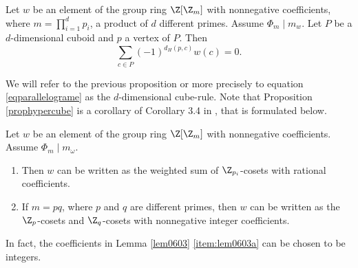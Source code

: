         \begin{prop}\label{prophypercube}
        Let $w$ be an element of the group ring $\Z[\Z_m]$ with nonnegative coefficients, where 
        $m=\prod_{i=1}^d p_i$, a product of $d$ different primes. Assume $\Phi_m \mid m_w$. Let $P$ be a $d$-dimensional
        cuboid and $p$ a vertex of $P$. Then
        \begin{equation}\label{eqparallelograme}
        \sum_{c \in P} (-1)^{d_H(p,c)}w(c)=0.
        \end{equation}
        \end{prop}
        We will refer to the previous proposition or more precisely to equation \eqref{eqparallelograme} as the $d$-dimensional cube-rule. Note that Proposition \ref{prophypercube} is a corollary of Corollary 3.4 in \cite{negyen}, that is formulated below. 
        \begin{lem}\label{lem0603}
        Let $w$ be an element of the group ring $\Z[\Z_m]$ with nonnegative coefficients. Assume $\Phi_m \mid m_{\omega}$.
        \begin{enumerate}
        \item\label{item:lem0603a} Then $w$ can be written as the weighted sum of $\Z_{p_i}$-cosets with rational coefficients. 
        \item If $m=pq$, where $p$ and $q$ are different primes, then $w$ can be written as the $\Z_p$-cosets and $\Z_q$-cosets with nonnegative integer coefficients.
        \end{enumerate}
        \end{lem}
        In fact, the coefficients in Lemma \ref{lem0603} \ref{item:lem0603a} can be chosen to be integers. 
        
